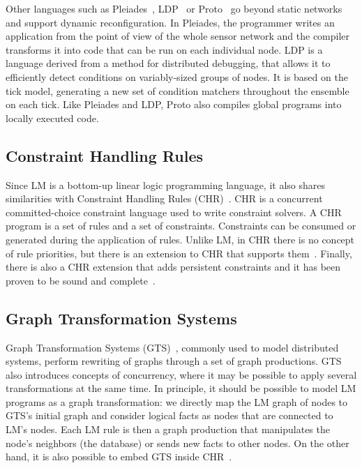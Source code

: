 Other languages such as Pleiades~\cite{Kothari:2007:REP:1250734.1250757},
LDP~\cite{4543691} or Proto~\cite{Beal:2006:IEE:1137236.1137354} go beyond
static networks and support dynamic reconfiguration. In Pleiades, the
programmer writes an application from the point of view of the whole
sensor network and the compiler transforms it into code that can be run on
each individual node.  LDP is a language derived from a method for
distributed debugging, that allows it to efficiently detect conditions on
variably-sized groups of nodes. It is based on the tick model, generating
a new set of condition matchers throughout the ensemble on each tick.
Like Pleiades and LDP, Proto also compiles global programs into locally
executed code.

\subsection{Constraint Handling Rules}

Since LM is a bottom-up linear logic programming language, it also shares
similarities with Constraint Handling Rules
(CHR)~\cite{Betz:2005kx,Betz:2013:LBA:2422085.2422086}.  CHR is a concurrent
committed-choice constraint language used to write constraint solvers. A CHR
program is a set of rules and a set of constraints. Constraints can be consumed
or generated during the application of rules.  Unlike LM, in CHR there is no
concept of rule priorities, but there is an extension to CHR that supports
them~\cite{DeKoninck:2007:URP:1273920.1273924}.  Finally, there is also a CHR
extension that adds persistent constraints and it has been proven to be sound
and complete~\cite{DBLP:journals/corr/abs-1007-3829}.

\subsection{Graph Transformation Systems}

Graph Transformation Systems (GTS)~\cite{Ehrig:2004vn}, commonly used to model
distributed systems, perform rewriting of graphs through a set of graph
productions. GTS also introduces concepts of concurrency, where it may be
possible to apply several transformations at the same time. In principle, it
should be possible to model LM programs as a graph transformation: we directly
map the LM graph of nodes to GTS's initial graph and consider logical facts as
nodes that are connected to LM's nodes. Each LM rule is then a graph production
that manipulates the node's neighbors (the database) or sends new facts to
other nodes. On the other hand, it is also possible to embed GTS inside
CHR~\cite{Raiser:2011:AGT:1972935.1972938}.
